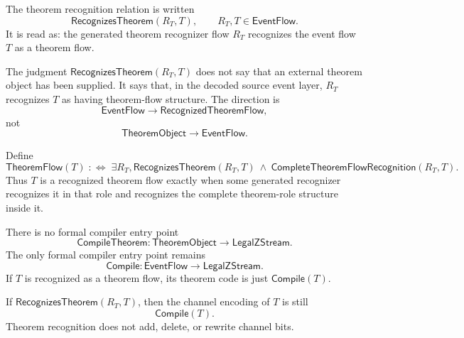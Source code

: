 \begin{definition}
\label{def:theorem-generated-recognition-relation}
The theorem recognition relation is written
$$
  \mathsf{RecognizesTheorem}(R_T,T),
  \qquad
  R_T,T \in \mathsf{EventFlow}.
$$
It is read as: the generated theorem recognizer flow $R_T$ recognizes the event flow $T$ as a theorem flow.
\end{definition}

\begin{remark}
\label{rem:theorem-generated-recognition-not-input}
The judgment $\mathsf{RecognizesTheorem}(R_T,T)$ does not say that an external theorem object has been supplied. It says that, in the decoded source event layer, $R_T$ recognizes $T$ as having theorem-flow structure. The direction is
$$
  \mathsf{EventFlow}
  \longrightarrow
  \mathsf{RecognizedTheoremFlow},
$$
not
$$
  \mathsf{TheoremObject}
  \longrightarrow
  \mathsf{EventFlow}.
$$
\end{remark}

\begin{definition}
\label{def:theorem-generated-recognized-theorem-flow}
Define
$$
  \mathsf{TheoremFlow}(T)
  \;:\Longleftrightarrow\;
  \exists R_T,
  \mathsf{RecognizesTheorem}(R_T,T)
  \ \wedge\
  \mathsf{CompleteTheoremFlowRecognition}(R_T,T).
$$
Thus $T$ is a recognized theorem flow exactly when some generated recognizer recognizes it in that role and recognizes the complete theorem-role structure inside it.
\end{definition}

\begin{principle}
\label{prin:theorem-generated-no-external-input}
There is no formal compiler entry point
$$
  \mathsf{CompileTheorem}:\mathsf{TheoremObject}\to\mathsf{LegalZStream}.
$$
The only formal compiler entry point remains
$$
  \mathsf{Compile}:\mathsf{EventFlow}\to\mathsf{LegalZStream}.
$$
If $T$ is recognized as a theorem flow, its theorem code is just $\mathsf{Compile}(T)$.
\end{principle}

\begin{proposition}
\label{prop:theorem-generated-recognition-preserves-code}
If $\mathsf{RecognizesTheorem}(R_T,T)$, then the channel encoding of $T$ is still
$$
  \mathsf{Compile}(T).
$$
Theorem recognition does not add, delete, or rewrite channel bits.
\end{proposition}

